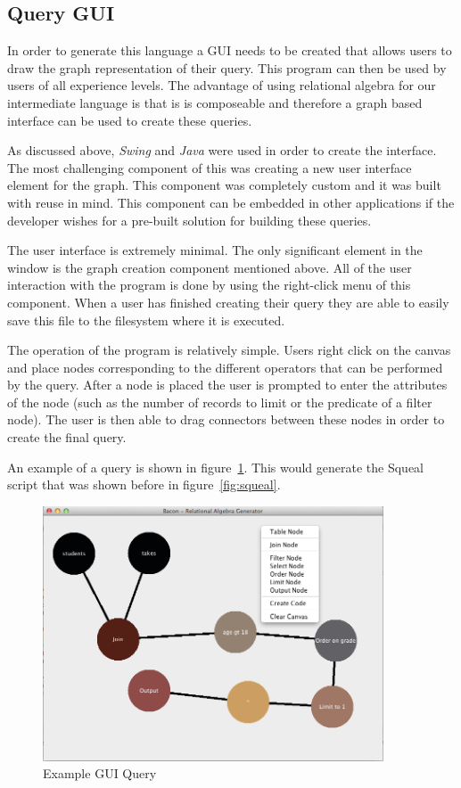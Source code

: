 \subsection{Query GUI}

In order to generate this language a \ac{GUI} needs to be created that allows
users to draw the graph representation of their query. This program can then be
used by users of all experience levels. The advantage of using relational
algebra for our intermediate language is that is is composeable and therefore
a graph based interface can be used to create these queries.

As discussed above, \emph{Swing} and \emph{Java} were used in order to create
the interface. The most challenging component of this was creating a new user
interface element for the graph. This component was completely custom and it
was built with reuse in mind. This component can be embedded in other
applications if the developer wishes for a pre-built solution for building
these queries.

The user interface is extremely minimal. The only significant element in the
window is the graph creation component mentioned above. All of the user
interaction with the program is done by using the right-click menu of this
component. When a user has finished creating their query they are able to
easily save this file to the filesystem where it is executed.

The operation of the program is relatively simple. Users right click on the
canvas and place nodes corresponding to the different operators that can be
performed by the query. After a node is placed the user is prompted to enter
the attributes of the node (such as the number of records to limit or the
predicate of a filter node). The user is then able to drag connectors between
these nodes in order to create the final query.

An example of a query is shown in figure~\ref{fig:bacon}. This would generate
the Squeal script that was shown before in figure~\ref{fig:squeal}.

\begin{figure}
  \centering
  \includegraphics[width=0.9\textwidth]{images/bacon}
  \caption{Example GUI Query}
  \label{fig:bacon}
\end{figure}
